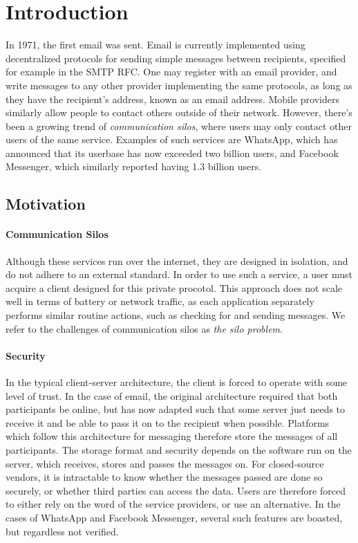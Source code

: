 \section{Introduction}
In 1971, the first email was sent\cite{tomlinson2009first}.
Email is currently implemented using decentralized protocols for sending simple messages between recipients, specified for example in the SMTP RFC\cite{RFC5321}.
One may register with an email provider, and write messages to any other provider implementing the same protocols, as long as they have the recipient's address, known as an email address.
Mobile providers similarly allow people to contact others outside of their network.
However, there's been a growing trend of \textit{communication silos}, where users may only contact other users of the same service.
Examples of such services are WhatsApp, which has announced that its userbase has now exceeded two billion users\cite{whatsapp_2b_users_archive_org}, and Facebook Messenger, which similarly reported having 1.3 billion users\cite{messenger_1pt3b_users}.

\subsection{Motivation}
\paragraph{Communication Silos}
Although these services run over the internet, they are designed in isolation, and do not adhere to an external standard.
In order to use such a service, a user must acquire a client designed for this private procotol.
This approach does not scale well in terms of battery or network traffic, as each application separately performs similar routine actions, such as checking for and sending messages.
We refer to the challenges of communication silos as \textit{the silo problem}.

\paragraph{Security}
In the typical client-server architecture, the client is forced to operate with some level of trust.
In the case of email, the original architecture required that both participants be online, but has now adapted such that some server just needs to receive it and be able to pass it on to the recipient when possible\cite{tomlinson2009first}.
Platforms which follow this architecture for messaging therefore store the messages of all participants.
The storage format and security depends on the software run on the server, which receives, stores and passes the messages on.
For closed-source vendors, it is intractable to know whether the messages passed are done so securely, or whether third parties can access the data.
Users are therefore forced to either rely on the word of the service providers, or use an alternative.
In the cases of WhatsApp and Facebook Messenger, several such features are boasted, but regardless not verified\cite{twitter_comms_protocol_comparison}.


